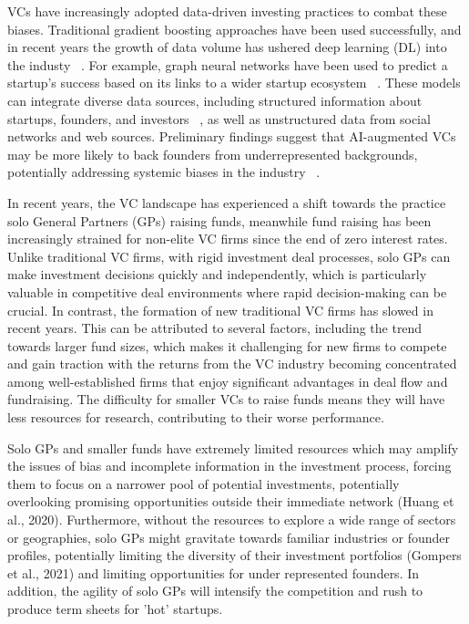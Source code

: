 \documentclass[a4paper, oneside]{discothesis}
\begin{document}
VCs have increasingly adopted data-driven investing practices to combat these biases. 
Traditional gradient boosting approaches have been used successfully, and in recent years the growth of data volume has ushered deep learning (DL) into the industy ~\cite{eqt}.
For example, graph neural networks have been used to predict a startup's success based on its links to a wider startup ecosystem ~\cite{corea}. 
These models can integrate diverse data sources, including structured information about startups, founders, and investors ~\cite{corea}, as well as unstructured data from social networks and web sources. 
Preliminary findings suggest that AI-augmented VCs may be more likely to back founders from underrepresented backgrounds, potentially addressing systemic biases in the industry ~\cite{futureVC}.

In recent years, the VC landscape has experienced a shift towards the practice solo General Partners (GPs)  raising funds, meanwhile fund raising has been increasingly strained for non-elite VC firms since the end of zero interest rates. Unlike traditional VC firms, with rigid investment deal processes, solo GPs can make investment decisions quickly and independently, which is particularly valuable in competitive deal environments where rapid decision-making can be crucial.
In contrast, the formation of new traditional VC firms has slowed in recent years. This can be attributed to several factors, including the trend towards larger fund sizes, which makes it challenging for new firms to compete and gain traction with the returns from the VC industry becoming concentrated among well-established firms that enjoy significant advantages in deal flow and fundraising. 
The difficulty for smaller VCs to raise funds means they will have less resources for research, contributing to their worse performance.

Solo GPs and smaller funds have extremely limited resources which may amplify the issues of bias and incomplete information in the investment process, forcing them to  focus on a narrower pool of potential investments, potentially overlooking promising opportunities outside their immediate network (Huang et al., 2020). Furthermore, without the resources to explore a wide range of sectors or geographies, solo GPs might gravitate towards familiar industries or founder profiles, potentially limiting the diversity of their investment portfolios (Gompers et al., 2021) and limiting opportunities for under represented founders. In addition, the agility of solo GPs will intensify the competition and rush to produce term sheets for 'hot' startups. 
\end{document}
